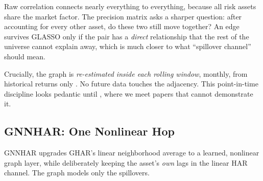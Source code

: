 \begin{intuition}
Raw correlation connects nearly everything to everything, because all risk assets share the market factor. The precision matrix asks a sharper question: after accounting for every other asset, do these two still move together? An edge survives GLASSO only if the pair has a \emph{direct} relationship that the rest of the universe cannot explain away, which is much closer to what ``spillover channel'' should mean.
\end{intuition}

Crucially, the graph is \emph{re-estimated inside each rolling window}, monthly, from historical returns only \citep[pp.~9, 14]{ZhangCucuringuDong2023}. No future data touches the adjacency. This point-in-time discipline looks pedantic until , where we meet papers that cannot demonstrate it.

\subsection{GNNHAR: One Nonlinear Hop}\label{sec:gnn:gnnhar-model}

GNNHAR upgrades GHAR's linear neighborhood average to a learned, nonlinear graph layer, while deliberately keeping the asset's \emph{own} lags in the linear HAR channel. The graph models only the spillovers.


